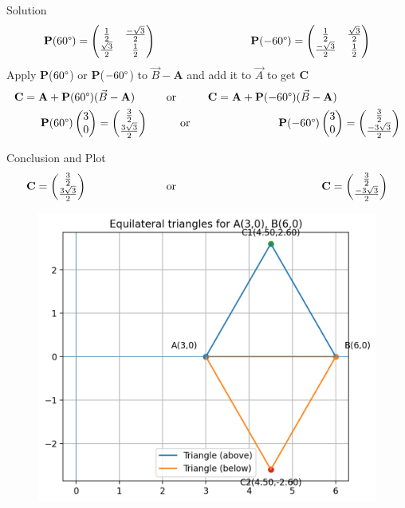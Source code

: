 \documentclass{beamer}
\numberwithin{equation}{section}
\theoremstyle{remark}
\newcommand{\myvec}[1]{\ensuremath{\begin{pmatrix}#1\end{pmatrix}}}
\let\vec\mathbf
\begin{document}
\begin{frame}{Solution}
\begin{align}
    \vec{P}(60\degree)=\myvec{
   \frac{1}{2} & \frac{-\sqrt{3}}{2}
    \\
   \frac{\sqrt{3}}{2} & \frac{1}{2}
   } \hspace{3cm}
   \vec{P}(-60\degree)=\myvec{
   \frac{1}{2} & \frac{\sqrt{3}}{2}
    \\
   \frac{-\sqrt{3}}{2} & \frac{1}{2}
   }\\
\end{align}
Apply $\vec{P}$($60\degree$) or $\vec{P}$($-60\degree$) to $\Vec{B}-\vec{A}$ and add it to $\Vec{A}$ to get $\vec{C}$\\
\begin{align}
    \vec{C}=\vec{A}+\vec{P}(60\degree)(\Vec{B}-\vec{A})\hspace{1cm} \text{or} \hspace{1cm}\vec{C}=\vec{A}+\vec{P}(-60\degree)(\Vec{B}-\vec{A})\hspace{2cm}\\
    \vec{P}(60\degree)\myvec{3\\0}=\myvec{\frac{3}{2}\\\frac{3\sqrt{3}}{2}} \hspace{1cm} \text{or} \hspace{2.8cm} \vec{P}(-60\degree)\myvec{3\\0}=\myvec{\frac{3}{2}\\\frac{-3\sqrt{3}}{2}}\\
    \end{align}
\end{frame}
\begin{frame}{Conclusion and Plot}
\begin{align}
    \vec{C}=\myvec{\frac{3}{2}\\\frac{3\sqrt{3}}{2}} \hspace{2.5cm} \text{or} \hspace{4.6cm} \vec{C}=\myvec{\frac{3}{2}\\\frac{-3\sqrt{3}}{2}}
\end{align}
\begin{figure}[H]
    \centering
    \includegraphics[width=0.5\columnwidth]{figs/01.png}
    \label{fig-1}
\end{figure}
\end{frame}
\end{document}

